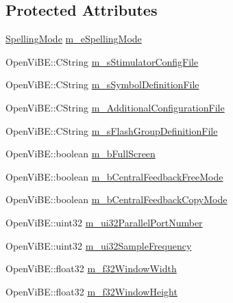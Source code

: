 \subsection*{Protected Attributes}
\begin{DoxyCompactItemize}
\item 
\hyperlink{namespaceOpenViBEApplications_ab6ab87a925d53afcb139f384cbf23f39}{SpellingMode} \hyperlink{classOpenViBEApplications_1_1P300InterfacePropertyReader_ab295fd27d5c928f4ffb3c7642c8c4a71}{m\_\-eSpellingMode}
\item 
OpenViBE::CString \hyperlink{classOpenViBEApplications_1_1P300InterfacePropertyReader_af95042964f27548705b6cbd039ad3533}{m\_\-sStimulatorConfigFile}
\item 
OpenViBE::CString \hyperlink{classOpenViBEApplications_1_1P300InterfacePropertyReader_a7f454796a80874d7102ec46c7c59c30b}{m\_\-sSymbolDefinitionFile}
\item 
OpenViBE::CString \hyperlink{classOpenViBEApplications_1_1P300InterfacePropertyReader_a12be7b7585a5c9db8ad96aaa39817f90}{m\_\-AdditionalConfigurationFile}
\item 
OpenViBE::CString \hyperlink{classOpenViBEApplications_1_1P300InterfacePropertyReader_a054066fe9c4c4a9a02068513e8684a65}{m\_\-sFlashGroupDefinitionFile}
\item 
OpenViBE::boolean \hyperlink{classOpenViBEApplications_1_1P300InterfacePropertyReader_a38d7a8702631ad10a31664e32e4395d0}{m\_\-bFullScreen}
\item 
OpenViBE::boolean \hyperlink{classOpenViBEApplications_1_1P300InterfacePropertyReader_a32a4dd646ac4d2025e824edc4284884b}{m\_\-bCentralFeedbackFreeMode}
\item 
OpenViBE::boolean \hyperlink{classOpenViBEApplications_1_1P300InterfacePropertyReader_ae4abb3ffb9fa16e24d70ae4e33fbbb21}{m\_\-bCentralFeedbackCopyMode}
\item 
OpenViBE::uint32 \hyperlink{classOpenViBEApplications_1_1P300InterfacePropertyReader_a59338ebef691060a96b2a18f3a6a11b6}{m\_\-ui32ParallelPortNumber}
\item 
OpenViBE::uint32 \hyperlink{classOpenViBEApplications_1_1P300InterfacePropertyReader_ae9ff03911a4fea4317d39dd91a6250fb}{m\_\-ui32SampleFrequency}
\item 
OpenViBE::float32 \hyperlink{classOpenViBEApplications_1_1P300InterfacePropertyReader_a313109c383219c02353430043d970fea}{m\_\-f32WindowWidth}
\item 
OpenViBE::float32 \hyperlink{classOpenViBEApplications_1_1P300InterfacePropertyReader_a099cd2f344c2255a6364d727b4bf0184}{m\_\-f32WindowHeight}

\end{DoxyCompactItemize}
